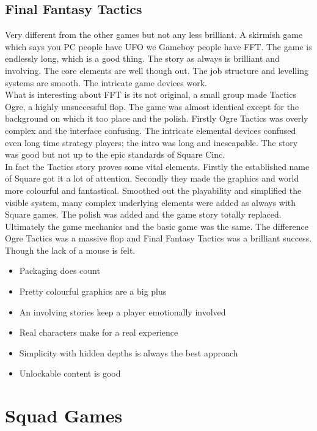 \documentclass[a4paper]{article}
\begin{document}
\subsection{Final Fantasy Tactics}
Very different from the other games but not any less brilliant. A skirmish game which says you PC people have UFO we Gameboy people have FFT. The game is endlessly long, which is a good thing. The story as always is brilliant and involving. The core elements are well though out. The job structure and levelling systems are smooth. The intricate game devices work.\\
What is interesting about FFT is its not original, a small group made Tactics Ogre, a highly unsuccessful flop. The game was almost identical except for the background on which it too place and the polish. Firstly Ogre Tactics was overly complex and the interface confusing. The intricate elemental devices confused even long time strategy players; the intro was long and inescapable. The story was good but not up to the epic standards of Square Cinc.\\
In fact the Tactics story proves some vital elements. Firstly the established name of Square got it a lot of attention. Secondly they made the graphics and world more colourful and fantastical. Smoothed out the playability and simplified the visible system, many complex underlying elements were added as always with Square games. The polish was added and the game story totally replaced. Ultimately the game mechanics and the basic game was the same. The difference Ogre Tactics was a massive flop and Final Fantasy Tactics was a brilliant success. Though the lack of a mouse is felt.\\
\begin{itemize}
\item Packaging does count
\item Pretty colourful graphics are a big plus
\item An involving stories keep a player emotionally involved
\item Real characters  make for a real experience
\item Simplicity with hidden depths is always the best approach
\item Unlockable content is good
\end{itemize}

\section{Squad Games}
\end{document}
